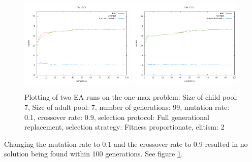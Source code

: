 \documentclass[11pt]{article}
\begin{document}
\begin{figure}[ht]
\begin{center}
\mbox{\includegraphics[width=0.49\textwidth]{images/21.png}}
\mbox{\includegraphics[width=0.49\textwidth]{images/22.png}}
\end{center}
\caption{Plotting of two EA runs on the one-max problem:
Size of child pool: 7,
Size of adult pool: 7,
number of generations: 99,
mutation rate: 0.1,
crossover rate: 0.9,
selection protocol: Full generational replacement,
selection strategy: Fitness proportionate,
elitism: 2}
\label{fig:2}
\end{figure}

Changing the mutation rate to 0.1 and the crossover rate to 0.9 resulted in no solution
being found within 100 generations. See figure \ref{fig:2}.
\end{document}
